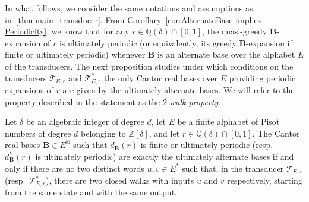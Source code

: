 \documentclass[12pt,reqno]{amsart}
\newcommand{\B}{{\mathbf{B}}}
\begin{document}
In what follows, we consider the same notations and assumptions as in~\cref{thm:main_transducer}. From Corollary~\ref{cor:AlternateBase-implies-Periodicity}, we know that for any $r\in\mathbb{Q}(\delta)\cap[0,1]$, the quasi-greedy $\B$-expansion of $r$ is ultimately periodic (or equivalently, its greedy $\B$-expansion if finite or ultimately periodic) whenever $\B$ is an alternate base over the alphabet $E$ of the transducers. The next proposition studies under which conditions on the transducers $\mathcal{T}_{E,r}$ and $\mathcal{T}^*_{E,r}$ the only Cantor real bases over $E$ providing periodic expansions of $r$ are given by the ultimately alternate bases. We will refer to the property described in the statement as the \emph{$2$-walk property}.

\begin{proposition}
\label{pro:2loops}
  Let $\delta$ be an algebraic integer of degree $d$, let $E$ be a finite alphabet of Pisot numbers of degree $d$ belonging to $\mathbb{Z}[\delta]$, and let $r\in\mathbb{Q}(\delta)\cap [0,1]$. The Cantor real bases $\B\in E^\mathbb{N}$ such that $d_{\B}(r)$ is finite or ultimately periodic (resp.\ $d_{\B}^*(r)$ is ultimately periodic) are exactly the ultimately alternate bases if and only if there are no two distinct words $u,v\in E^*$ such that, in the transducer $\mathcal{T}_{E,r}$ (resp.\ $\mathcal{T}^*_{E,r}$), there are two closed walks with inputs $u$ and $v$ respectively, starting from the same state and with the same output.
\end{proposition}
\end{document}
